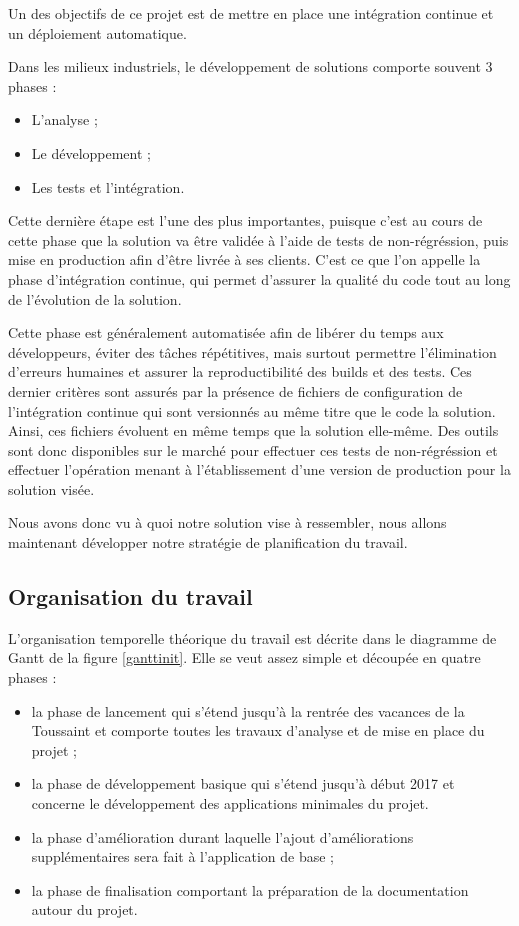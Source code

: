 Un des objectifs de ce projet est de mettre en place une intégration continue et un déploiement automatique.

Dans les milieux industriels, le développement de solutions comporte souvent 3 phases :
\begin{itemize}
    \item L'analyse ;
    \item Le développement ;
    \item Les tests et l'intégration.
\end{itemize}

Cette dernière étape est l'une des plus importantes, puisque c'est au cours de cette phase que la solution va être validée à l'aide de tests de non-régréssion, puis mise en production afin d'être livrée à ses clients. C'est ce que l'on appelle la phase d'intégration continue, qui permet d'assurer la qualité du code tout au long de l'évolution de la solution.

Cette phase est généralement automatisée afin de libérer du temps aux développeurs, éviter des tâches répétitives, mais surtout permettre l'élimination d'erreurs humaines et assurer la reproductibilité des builds et des tests. Ces dernier critères sont assurés par la présence de fichiers de configuration de l'intégration continue qui sont versionnés au même titre que le code la solution. Ainsi, ces fichiers évoluent en même temps que la solution elle-même.
Des outils sont donc disponibles sur le marché pour effectuer ces tests de non-régréssion et effectuer l'opération menant à l'établissement d'une version de production pour la solution visée.

Nous avons donc vu à quoi notre solution vise à ressembler, nous allons maintenant développer notre stratégie de planification du travail.

\subsection{Organisation du travail}

L'organisation temporelle théorique du travail est décrite dans le diagramme de Gantt de la figure \ref{ganttinit}. Elle se veut assez simple et découpée en quatre phases :

\begin{itemize}
    \item la phase de lancement qui s’étend jusqu’à la rentrée des vacances de la Toussaint et comporte toutes les travaux d’analyse et de mise en place du projet ;
    \item la phase de développement basique qui s’étend jusqu’à début 2017 et concerne le développement des applications minimales du projet.
    \item la phase d’amélioration durant laquelle l’ajout d’améliorations supplémentaires sera fait à l’application de base ;
    \item la phase de finalisation comportant la préparation de la documentation autour du projet.
\end{itemize}

